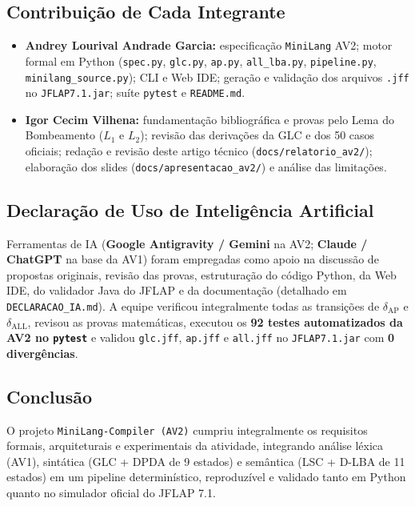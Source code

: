 \subsection{Contribuição de Cada Integrante}

\begin{itemize}
    \item \textbf{Andrey Lourival Andrade Garcia:} especificação \texttt{MiniLang} AV2; motor formal em Python (\texttt{spec.py}, \texttt{glc.py}, \texttt{ap.py}, \texttt{all\_lba.py}, \texttt{pipeline.py}, \texttt{minilang\_source.py}); CLI e Web IDE; geração e validação dos arquivos \texttt{.jff} no \texttt{JFLAP7.1.jar}; suíte \texttt{pytest} e \texttt{README.md}.
    \item \textbf{Igor Cecim Vilhena:} fundamentação bibliográfica e provas pelo Lema do Bombeamento ($L_1$ e $L_2$); revisão das derivações da GLC e dos 50 casos oficiais; redação e revisão deste artigo técnico (\texttt{docs/relatorio\_av2/}); elaboração dos slides (\texttt{docs/apresentacao\_av2/}) e análise das limitações.
\end{itemize}

\subsection{Declaração de Uso de Inteligência Artificial}

Ferramentas de IA (\textbf{Google Antigravity / Gemini} na AV2; \textbf{Claude / ChatGPT} na base da AV1) foram empregadas como apoio na discussão de propostas originais, revisão das provas, estruturação do código Python, da Web IDE, do validador Java do JFLAP e da documentação (detalhado em \texttt{DECLARACAO\_IA.md}). A equipe verificou integralmente todas as transições de $\delta_{\text{AP}}$ e $\delta_{\text{ALL}}$, revisou as provas matemáticas, executou os \textbf{92 testes automatizados da AV2 no \texttt{pytest}} e validou \texttt{glc.jff}, \texttt{ap.jff} e \texttt{all.jff} no \texttt{JFLAP7.1.jar} com \textbf{0 divergências}.

\subsection{Conclusão}

O projeto \texttt{MiniLang-Compiler (AV2)} cumpriu integralmente os requisitos formais, arquiteturais e experimentais da atividade, integrando análise léxica (AV1), sintática (GLC + DPDA de 9 estados) e semântica (LSC + D-LBA de 11 estados) em um pipeline determinístico, reproduzível e validado tanto em Python quanto no simulador oficial do JFLAP 7.1.
